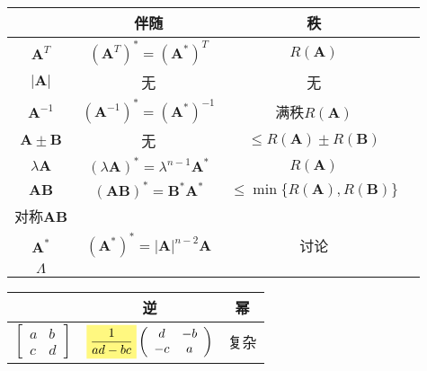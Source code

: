 \documentclass[UTF8,a4paper,12pt,scheme=chinese]{ctexbook}
\newcommand{\jz}[1]{\boldsymbol{#1}}
\newcommand{\hla}[1]{%
	\colorbox{yellow!50}{$\displaystyle#1$}}
\begin{document}
		\begin{longtable}{|c|c|c|c|}
		\hline 
		& 伴随 & 秩 &  
		\\\hline  
		$ \jz{A}^T $ & $ (\jz{A}^T)^*=(\jz{A}^*)^T $ & $ R(\jz{A}) $  &   
		\\\hline 
		$ |\jz{A}| $ & 无 & 无 &  
		\\\hline
		$ \jz{A}^{-1} $ & $ (\jz{A}^{-1})^*=(\jz{A}^*)^{-1}$ & 满秩$ R(\jz{A}) $ &  
		\\\hline
		$ \jz{A}\pm\jz{B} $ & 无 & $ \leq R(\jz{A})\pm R(\jz{B}) $ &
		\\\hline
		$ \lambda\jz{A} $ & $ (\lambda\jz{A})^*=\lambda^{n-1}\jz{A}^* $ & $ R(\jz{A}) $ &
		\\\hline
		$ \jz{A}\jz{B} $ & $ (\jz{A}\jz{B})^*=\jz{B}^*\jz{A}^* $ & $ \leq \min\{R(\jz{A}),R(\jz{B})\} $ &
		\\\hline
		对称$ \jz{A}\jz{B} $ &  &  &  
		\\\hline
		$ \jz{A}^* $ & $ (\jz{A}^*)^*=|\jz{A}|^{n-2}\jz{A} $ & 讨论 &  
		\\\hline
		$ \jz{\varLambda} $ &&&
		\\\hline
	\end{longtable}	
	\begin{longtable}{|c|c|c|}
		\hline
		& 逆 & 幂\\
		\hline
		 $ \left[\begin{array}{cc}
		a&b\\
		c&d
		\end{array}\right]   $ & $ \hla{\frac{1}{a d-b c}}		
		\left(
		\begin{array}{cc}
		d & -b \\
		-c & a \\
		\end{array}
		\right) $ & 复杂\\
		\hline
		
		
	\end{longtable}
\end{document}
